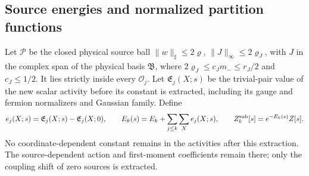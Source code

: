 \documentclass[11pt,letterpaper,reqno]{amsart}
\theoremstyle{definition}
\theoremstyle{remark}
\begin{document}
\subsection{Source energies and normalized partition functions}

Let $\mathcal P$ be the closed physical source ball
$\|w\|_\sharp\le2\varrho$, $\|J\|_\infty\le2\varrho_J$,
with $J$ in the complex span of the physical basis $\mathfrak B$,
where $2\varrho_J\le c_Jm_-\le r_J/2$ and $c_J\le1/2$.
It lies strictly inside every $\mathscr O_j$.
Let $\mathfrak E_j(X;s)$ be the trivial-pair value of the
new scalar activity before its constant is extracted,
including its gauge and fermion normalizers and Gaussian
family. Define
\[
 e_j(X;s)=\mathfrak E_j(X;s)-\mathfrak E_j(X;0),\qquad
 E_k(s)=E_k+\sum_{j\le k}\sum_X e_j(X;s),\qquad
 Z_k^{\rm sub}[s]=e^{-E_k(s)}Z[s].
\]
No coordinate-dependent constant remains in the activities
after this extraction. The source-dependent action and
first-moment coefficients remain there; only the coupling
shift of zero sources is extracted.
\end{document}
